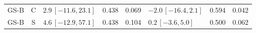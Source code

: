 \begin{longtable}{lcp{37mm}rrp{37mm}rr}
GS-B & C & \(2.9\,[-11.6,23.1]\) & 0.438 & 0.069 & \(-2.0\,[-16.4,2.1]\) & 0.594 & 0.042\\
GS-B & S & \(4.6\,[-12.9,57.1]\) & 0.438 & 0.104 & \(0.2\,[-3.6,5.0]\) & 0.500 & 0.062\\

\end{longtable}

